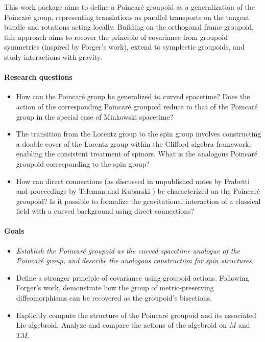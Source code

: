 \documentclass[a4paper]{article}
\begin{document}
This work package aims to define a Poincaré groupoid as a generalization of the Poincaré group, representing translations as parallel transports on the tangent bundle and rotations acting locally. Building on the orthogonal frame groupoid, this approach aims to recover the principle of covariance from groupoid symmetries (inspired by Forger’s work), extend to symplectic groupoids, and study interactions with gravity.


\paragraph{Research questions}

\begin{itemize}[noitemsep, topsep=0pt, parsep=0pt, partopsep=0pt]
    \item How can the Poincaré group be generalized to curved spacetime? Does the action of the corresponding Poincaré groupoid reduce to that of the Poincaré group in the special case of Minkowski spacetime?
    \item The transition from the Lorentz group to the spin group involves constructing a double cover of the Lorentz group within the Clifford algebra framework, enabling the consistent treatment of spinors. What is the analogous Poincaré groupoid corresponding to the spin group?
    \item How can direct connections (as discussed in unpublished notes by Frabetti \cite{Azzali2022} and proceedings by Teleman \cite{Teleman2007, Teleman2004} and Kubarski \cite{Kubarski2008, Kubarski2007}) be characterized on the Poincaré groupoid? Is it possible to formalize the gravitational interaction of a classical field with a curved background using direct connections?
\end{itemize}


\paragraph{Goals}

\begin{itemize}[noitemsep, topsep=0pt, parsep=0pt, partopsep=0pt]
    \item \it Establish the Poincaré groupoid as the curved spacetime analogue of the Poincaré group, and describe the analogous construction for spin structures.
    \item Define a stronger principle of covariance using groupoid actions. Following Forger's work, demonstrate how the group of metric-preserving diffeomorphisms can be recovered as the groupoid's bisections.
    \item Explicitly compute the structure of the Poincaré groupoid and its associated Lie algebroid. Analyze and compare the actions of the algebroid on \( M \) and \( TM \).
\end{itemize}
\end{document}
